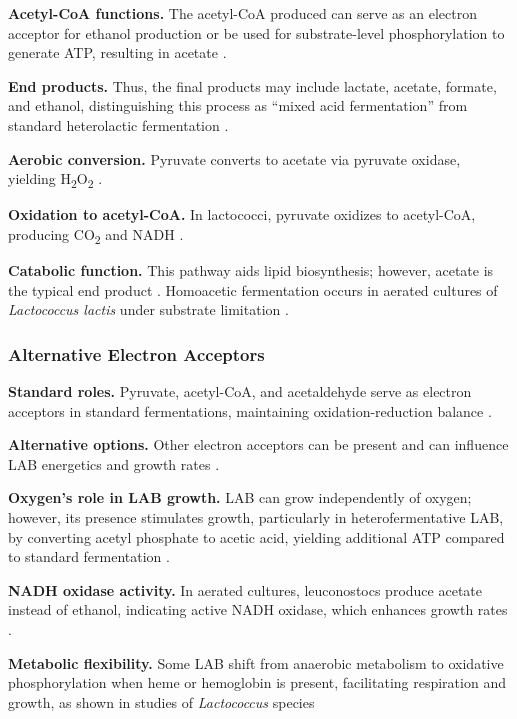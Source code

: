 \textbf{Acetyl-CoA functions.} The acetyl-CoA produced can serve as an electron acceptor for ethanol production or be used for substrate-level phosphorylation to generate ATP, resulting in acetate \cite*{L3-LAB}.

\textbf{End products.} Thus, the final products may include lactate, acetate, formate, and ethanol, distinguishing this process as “mixed acid fermentation” from standard heterolactic fermentation \cite*{L3-LAB}.

\textbf{Aerobic conversion.} Pyruvate converts to acetate via pyruvate oxidase, yielding H\textsubscript{2}O\textsubscript{2} \cite*{L3-LAB}.

\textbf{Oxidation to acetyl-CoA.} In lactococci, pyruvate oxidizes to acetyl-CoA, producing CO\textsubscript{2} and NADH \cite*{L3-LAB}.

\textbf{Catabolic function.} This pathway aids lipid biosynthesis; however, acetate is the typical end product \cite*{L3-LAB}. Homoacetic fermentation occurs in aerated cultures of \textit{Lactococcus lactis} under substrate limitation \cite*{L3-LAB}.

\subsubsection{Alternative Electron Acceptors}
\textbf{Standard roles.} Pyruvate, acetyl-CoA, and acetaldehyde serve as electron acceptors in standard fermentations, maintaining oxidation-reduction balance \cite*{L3-LAB}.

\textbf{Alternative options.} Other electron acceptors can be present and can influence LAB energetics and growth rates \cite*{L3-LAB}.

\textbf{Oxygen’s role in LAB growth.} LAB can grow independently of oxygen; however, its presence stimulates growth, particularly in heterofermentative LAB, by converting acetyl phosphate to acetic acid, yielding additional ATP compared to standard fermentation \cite*{L3-LAB}.

\textbf{NADH oxidase activity.} In aerated cultures, leuconostocs produce acetate instead of ethanol, indicating active NADH oxidase, which enhances growth rates \cite*{L3-LAB}.

\textbf{Metabolic flexibility.} Some LAB shift from anaerobic metabolism to oxidative phosphorylation when heme or hemoglobin is present, facilitating respiration and growth, as shown in studies of \textit{Lactococcus} species \cite*{L3-LAB}

